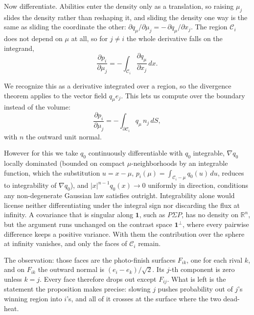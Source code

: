 \documentclass[11pt]{article}
\newcommand{\R}{\mathbb{R}}
\begin{document}
Now differentiate. Abilities enter the density only as a translation, so
raising $\mu_j$ slides the density rather than reshaping it, and sliding
the density one way is the same as sliding the coordinate the other:
$\partial q_\mu/\partial\mu_j=-\,\partial q_\mu/\partial x_j$. The region
$\mathcal{C}_i$ does not depend on $\mu$ at all, so for $j\ne i$ the whole
derivative falls on the integrand,
\[
  \frac{\partial p_i}{\partial\mu_j}
   =-\int_{\mathcal{C}_i}\frac{\partial q_\mu}{\partial x_j}\,dx .
\]

We recognize this as a derivative integrated over a region, so the
divergence theorem applies to the vector field $q_\mu e_j$. This lets us
compute over the boundary instead of the volume:
\[
  \frac{\partial p_i}{\partial\mu_j}
   =-\int_{\partial \mathcal{C}_i}q_\mu\,n_j\,dS ,
\]
with $n$ the outward unit normal.

However for this we take $q_0$ continuously differentiable with $q_0$
integrable, $\nabla q_0$ locally dominated (bounded on compact
$\mu$-neighborhoods by an integrable function, which the substitution
$u=x-\mu$, $p_i(\mu)=\int_{\mathcal{C}_i-\mu}q_0(u)\,du$, reduces to integrability
of $\nabla q_0$), and $|x|^{n-1}q_0(x)\to0$ uniformly in direction,
conditions any non-degenerate Gaussian law satisfies outright.
Integrability alone would
license neither differentiating under the integral sign nor discarding
the flux at infinity. A covariance that is singular along $\mathbf{1}$,
such as $P\Sigma P$, has no density on $\R^n$, but the argument runs
unchanged on the contrast space $\mathbf{1}^{\perp}$, where every pairwise
difference keeps a positive variance. With them the contribution over the sphere at
infinity vanishes, and only the faces of $\mathcal{C}_i$ remain.

The observation: those faces are the photo-finish surfaces $F_{ik}$, one
for each rival $k$, and on $F_{ik}$ the outward normal is
$(e_i-e_k)/\sqrt2$. Its $j$-th component is zero unless $k=j$. Every face
therefore drops out except $F_{ij}$. What is left is the statement the
proposition makes precise: slowing $j$ pushes probability out of $j$'s
winning region into $i$'s, and all of it crosses at the surface where the
two dead-heat.
\end{document}

